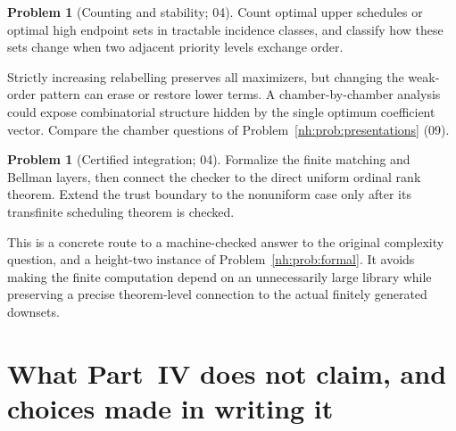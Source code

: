 \documentclass[11pt,a4paper]{article}
\theoremstyle{definition}
\newtheorem{problem}[theorem]{Problem}
\theoremstyle{remark}
\begin{document}
\begin{problem}[Counting and stability; 04]\label{nh:ur:prob:counting}
Count optimal upper schedules or optimal high endpoint sets in tractable
incidence classes, and classify how these sets change when two adjacent
priority levels exchange order.
\end{problem}
Strictly increasing relabelling preserves all maximizers, but changing the
weak-order pattern can erase or restore lower terms. A chamber-by-chamber
analysis could expose combinatorial structure hidden by the single optimum
coefficient vector. Compare the chamber questions of
Problem~\ref{nh:prob:presentations} (09).

\begin{problem}[Certified integration; 04]\label{nh:ur:prob:formal}
Formalize the finite matching and Bellman layers, then connect the checker to
the direct uniform ordinal rank theorem. Extend the trust boundary to the
nonuniform case only after its transfinite scheduling theorem is checked.
\end{problem}
This is a concrete route to a machine-checked answer to the original
complexity question, and a height-two instance of
Problem~\ref{nh:prob:formal}. It avoids making the finite computation depend
on an unnecessarily large library while preserving a precise theorem-level
connection to the actual finitely generated downsets.

\section{What Part~IV does not claim, and choices made in writing it}
\label{nh:ur:sec:nonclaims}
\setcounter{equation}{0}
\end{document}
